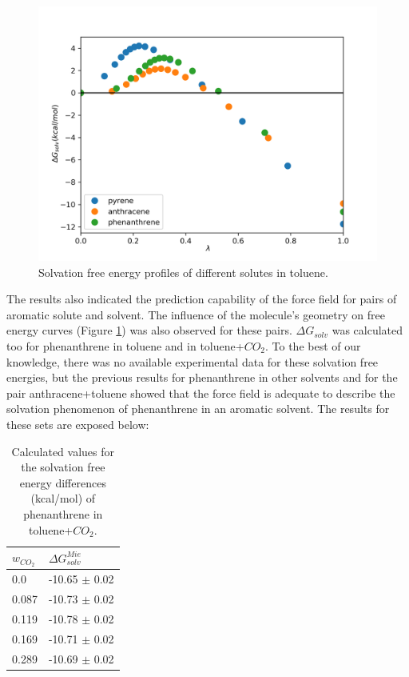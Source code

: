 \begin{figure}[H]
	\centering
    \includegraphics[width=0.9\linewidth]{Figures/tol}
    \caption{Solvation free energy profiles of different solutes in toluene. }
    \label{fig:tol}
\end{figure}

 The results also indicated the prediction capability of the force field for pairs of aromatic solute and solvent. The influence of the molecule's geometry on free energy curves (Figure \ref{fig:tol}) was also observed for these pairs. $\Delta G_{solv}$ was calculated too for phenanthrene in toluene and in toluene+$CO_{2}$. To the best of our knowledge, there was no available experimental data for these solvation free energies, but the previous results for phenanthrene in other solvents and for the pair anthracene+toluene showed that the force field is adequate to describe the solvation phenomenon of phenanthrene in an aromatic solvent. The results for these sets are exposed below: 
 
\FloatBarrier
\begin{table}[H]
\centering
  \caption{Calculated values for the solvation free energy differences (kcal/mol) of phenanthrene in toluene+$CO_{2}$.}
  \label{tbl:solv3}
  \begin{tabular}{ll}
    \hline
      $w_{CO_{2}}$ & $\Delta G_{solv}^{Mie}$ \\
    \hline
    0.0    & -10.65 $\pm$ 0.02   \\
    0.087  & -10.73 $\pm$ 0.02   \\
    0.119  & -10.78 $\pm$ 0.02   \\
    0.169  & -10.71 $\pm$ 0.02   \\
    0.289  & -10.69 $\pm$ 0.02   \\
    \hline
  \end{tabular}
\end{table}
\FloatBarrier

